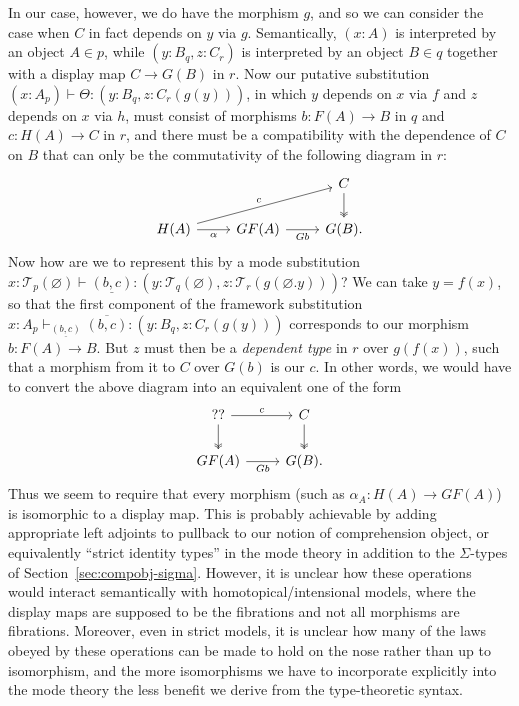 \documentclass[10pt]{article}
\theoremstyle{definition}
\let\emptyset\varnothing
\newcommand{\yields}{\vdash}
\newcommand\El[2]{\mathcal{T}_{#1}(#2)}
\newcommand{\upstairs}[1]{\overline{#1}}
\newcommand{\downstairs}[1]{\underline{#1}}
\begin{document}
In our case, however, we do have the morphism $g$, and so we can consider the case when $C$ in fact depends on $y$ via $g$.
Semantically, $(x:A)$ is interpreted by an object $A\in p$, while $(y:B_q,z:C_r)$ is interpreted by an object $B\in q$ together with a display map $C \to G(B)$ in $r$.
Now our putative substitution $(x:A_p) \yields \Theta : (y:B_q, z:C_r(g(y)))$, in which $y$ depends on $x$ via $f$ and $z$ depends on $x$ via $h$, must consist of morphisms $b:F(A) \to B$ in $q$ and $c:H(A) \to C$ in $r$, and there must be a compatibility with the dependence of $C$ on $B$ that can only be the commutativity of the following diagram in $r$:
\[
  \begin{tikzcd}
    && C \ar[d,two heads] \\
    H(A) \ar[urr,"c"] \ar[r,"\alpha"'] & GF(A) \ar[r,"Gb"'] & G(B).
  \end{tikzcd}
\]
Now how are we to represent this by a mode substitution $x:\El{p}{\emptyset} \yields \downstairs{(b,c)} : (y:\El{q}{\emptyset},z:\El{r}{g(\emptyset.y)})$?
We can take $y = f(x)$, so that the first component of the framework substitution $x:A_p \yields_{\downstairs{(b,c)}} \upstairs{(b,c)} : (y:B_q, z:C_r(g(y)))$ corresponds to our morphism $b:F(A) \to B$.
But $z$ must then be a \emph{dependent type} in $r$ over $g(f(x))$, such that a morphism from it to $C$ over $G(b)$ is our $c$.
In other words, we would have to convert the above diagram into an equivalent one of the form
\[
  \begin{tikzcd}
    ?? \ar[r,"c"] \ar[d,two heads] & C \ar[d,two heads] \\
    GF(A) \ar[r,"Gb"'] & G(B).
  \end{tikzcd}
\]
Thus we seem to require that every morphism (such as $\alpha_A : H(A) \to GF(A)$) is isomorphic to a display map.
This is probably achievable by adding appropriate left adjoints to pullback to our notion of comprehension object, or equivalently ``strict identity types'' in the mode theory in addition to the $\Sigma$-types of Section~\ref{sec:compobj-sigma}.
However, it is unclear how these operations would interact semantically with homotopical/intensional models, where the display maps are supposed to be the fibrations and not all morphisms are fibrations.
Moreover, even in strict models, it is unclear how many of the laws obeyed by these operations can be made to hold on the nose rather than up to isomorphism, and the more isomorphisms we have to incorporate explicitly into the mode theory the less benefit we derive from the type-theoretic syntax.





\end{document}

